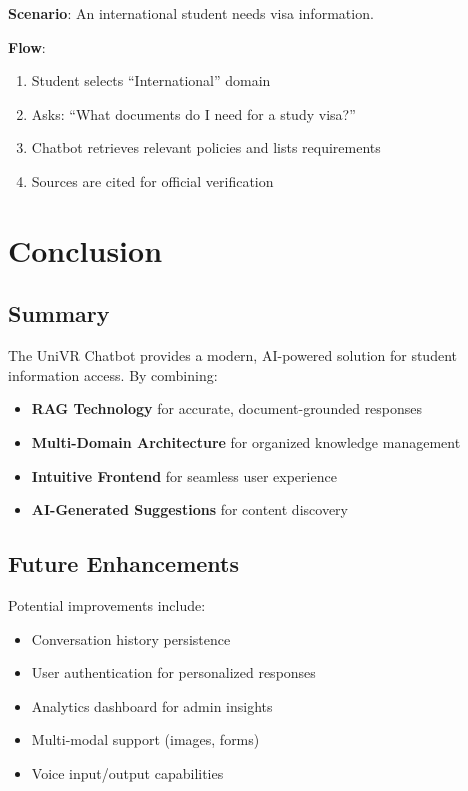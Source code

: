 \documentclass[12pt,a4paper]{article}
\begin{document}
\begin{tcolorbox}[colback=blue!5, colframe=blue!60!black, title=\textbf{International Student}]
    \textbf{Scenario}: An international student needs visa information.
    
    \textbf{Flow}:
    \begin{enumerate}[noitemsep]
        \item Student selects ``International'' domain
        \item Asks: ``What documents do I need for a study visa?''
        \item Chatbot retrieves relevant policies and lists requirements
        \item Sources are cited for official verification
    \end{enumerate}
\end{tcolorbox}

\section{Conclusion}

\subsection{Summary}

The UniVR Chatbot provides a modern, AI-powered solution for student information access. By combining:
\begin{itemize}
    \item \textbf{RAG Technology} for accurate, document-grounded responses
    \item \textbf{Multi-Domain Architecture} for organized knowledge management
    \item \textbf{Intuitive Frontend} for seamless user experience
    \item \textbf{AI-Generated Suggestions} for content discovery
\end{itemize}

\subsection{Future Enhancements}

Potential improvements include:
\begin{itemize}
    \item Conversation history persistence
    \item User authentication for personalized responses
    \item Analytics dashboard for admin insights
    \item Multi-modal support (images, forms)
    \item Voice input/output capabilities
\end{itemize}

\end{document}
